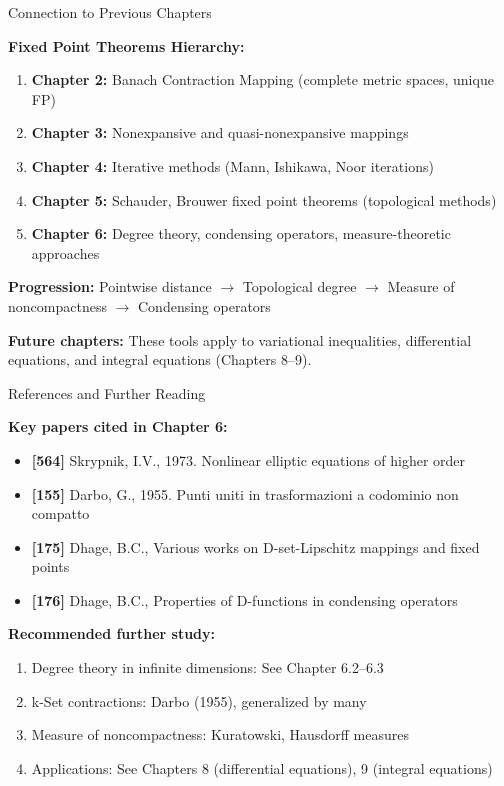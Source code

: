 \documentclass[aspectratio=169,10pt]{beamer}
\begin{document}
\begin{frame}{Connection to Previous Chapters}

\textbf{Fixed Point Theorems Hierarchy:}

\begin{enumerate}
    \item \textbf{Chapter 2:} Banach Contraction Mapping (complete metric spaces, unique FP)
    \item \textbf{Chapter 3:} Nonexpansive and quasi-nonexpansive mappings
    \item \textbf{Chapter 4:} Iterative methods (Mann, Ishikawa, Noor iterations)
    \item \textbf{Chapter 5:} Schauder, Brouwer fixed point theorems (topological methods)
    \item \textbf{Chapter 6:} Degree theory, condensing operators, measure-theoretic approaches
\end{enumerate}

\vspace{0.5cm}

\textbf{Progression:} Pointwise distance $\to$ Topological degree $\to$ Measure of noncompactness $\to$ Condensing operators

\vspace{0.5cm}

\textbf{Future chapters:} These tools apply to variational inequalities, differential equations, and integral equations (Chapters 8--9).

\end{frame}

\begin{frame}[fragile]{References and Further Reading}

\textbf{Key papers cited in Chapter 6:}
\begin{itemize}
    \item \textbf{[564]} Skrypnik, I.V., 1973. Nonlinear elliptic equations of higher order
    \item \textbf{[155]} Darbo, G., 1955. Punti uniti in trasformazioni a codominio non compatto
    \item \textbf{[175]} Dhage, B.C., Various works on D-set-Lipschitz mappings and fixed points
    \item \textbf{[176]} Dhage, B.C., Properties of D-functions in condensing operators
\end{itemize}

\vspace{0.4cm}

\textbf{Recommended further study:}
\begin{enumerate}
    \item Degree theory in infinite dimensions: See Chapter 6.2--6.3
    \item k-Set contractions: Darbo (1955), generalized by many
    \item Measure of noncompactness: Kuratowski, Hausdorff measures
    \item Applications: See Chapters 8 (differential equations), 9 (integral equations)
\end{enumerate}

\end{frame}
\end{document}
